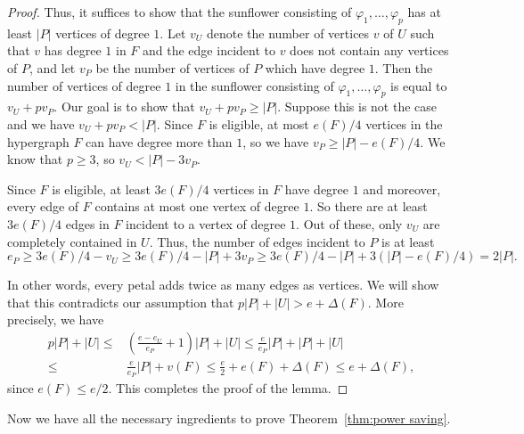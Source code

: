 \documentclass{daj}
\theoremstyle{plain}
\theoremstyle{remark}
\begin{document}
\begin{proof}
Thus, it suffices to show that the sunflower consisting of $\varphi_1, \dots, \varphi_p$ has at least $|P|$ vertices of degree $1$. Let $v_U$ denote the number of vertices $v$ of $U$ such that $v$ has degree $1$ in $F$ and the edge incident to $v$ does not contain any vertices of $P$, and let $v_P$ be the number of vertices of $P$ which have degree $1$. Then the number of vertices of degree $1$ in the sunflower consisting of $\varphi_1,\dots,\varphi_p$ is equal to $v_U+pv_P$. Our goal is to show that $v_U+pv_P\geq |P|$. Suppose this is not the case and we have $v_U+pv_P<|P|$. Since $F$ is eligible, at most $e(F)/4$ vertices in the hypergraph $F$ can have degree more than $1$, so we have $v_P\geq |P|-e(F)/4$. We know that $p\geq 3$, so $v_U <  |P|-3v_P$.

Since $F$ is eligible, at least $3e(F)/4$ vertices in $F$ have degree $1$ and moreover, every edge of $F$ contains at most one vertex of degree $1$. So there are at least $3e(F)/4$ edges in $F$ incident to a vertex of degree $1$. Out of these, only $v_U$ are completely contained in $U$. Thus, the number of edges incident to $P$ is at least \[e_P\geq 3e(F)/4-v_U\geq 3e(F)/4-|P|+3v_P\geq 3e(F)/4-|P|+3(|P|-e(F)/4)=2|P|.\] 

In other words, every petal adds twice as many edges as vertices. We will show that this contradicts our assumption that $p|P| + |U| > e + \Delta(F)$. More precisely, we have 
\begin{align*}
p|P|+|U|\leq &\left(\frac{e-e_U}{e_P}+1\right)|P| +|U|\leq \frac{e}{e_P}|P|+|P|+|U|\\
\leq & \frac{e}{e_P}|P|+v(F)\leq \frac{e}{2}+e(F)+\Delta(F)\leq e+\Delta(F),
\end{align*}
since $e(F) \le e/2$. This completes the proof of the lemma.
\end{proof}

Now we have all the necessary ingredients to prove Theorem~\ref{thm:power saving}.
\end{document}
